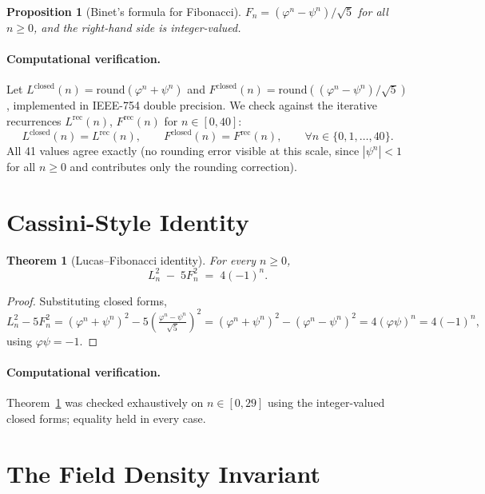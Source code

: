 \documentclass[11pt]{article}
\newtheorem{theorem}{Theorem}
\newtheorem{proposition}{Proposition}
\begin{document}
\begin{proposition}[Binet's formula for Fibonacci]
$F_n = (\varphi^n - \psi^n)/\sqrt{5}$ for all $n \geq 0$, and the right-hand
side is integer-valued.
\end{proposition}

\paragraph{Computational verification.}
Let $L^{\text{closed}}(n) = \mathrm{round}(\varphi^n + \psi^n)$ and
$F^{\text{closed}}(n) = \mathrm{round}((\varphi^n - \psi^n)/\sqrt{5})$,
implemented in IEEE-754 double precision. We check against the iterative
recurrences $L^{\text{rec}}(n)$, $F^{\text{rec}}(n)$ for $n \in [0,40]$:
\[
L^{\text{closed}}(n) = L^{\text{rec}}(n), \qquad
F^{\text{closed}}(n) = F^{\text{rec}}(n), \qquad
\forall n \in \{0, 1, \dots, 40\}.
\]
All 41 values agree exactly (no rounding error visible at this scale, since
$|\psi^n| < 1$ for all $n \geq 0$ and contributes only the rounding correction).

\section{Cassini-Style Identity}

\begin{theorem}[Lucas--Fibonacci identity]
\label{thm:cassini}
For every $n \geq 0$,
\[
L_n^2 \;-\; 5 F_n^2 \;=\; 4(-1)^n.
\]
\end{theorem}

\begin{proof}
Substituting closed forms,
\[
L_n^2 - 5F_n^2
= (\varphi^n + \psi^n)^2 - 5\left(\tfrac{\varphi^n - \psi^n}{\sqrt{5}}\right)^2
= (\varphi^n + \psi^n)^2 - (\varphi^n - \psi^n)^2
= 4(\varphi\psi)^n
= 4(-1)^n,
\]
using $\varphi\psi = -1$.
\end{proof}

\paragraph{Computational verification.}
Theorem~\ref{thm:cassini} was checked exhaustively on $n \in [0, 29]$ using
the integer-valued closed forms; equality held in every case.

\section{The Field Density Invariant}
\end{document}

